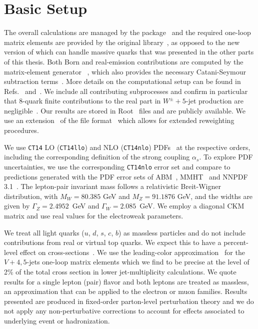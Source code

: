 \section{Basic Setup}
\label{sec_setup}
The overall calculations are managed by the \SHERPA{}
package~\cite{Sherpa} and the required one-loop matrix elements are
provided by the original \BlackHat{}
library~\cite{Berger:2008sj}, as opposed to the new version of \BlackHat{} \cite{wbbpaper} which
  can handle massive quarks that was presented in the other
  parts of this thesis. Both Born and real-emission contributions
are computed by the matrix-element generator \COMIX{}~\cite{Comix}, which also
provides the necessary Catani-Seymour subtraction
terms~\cite{Catani:1996vz}. More details on the computational setup
can be found in Refs.~\cite{BH:W5j} and~\cite{BH:Z4j}. We include all
contributing subprocesses and confirm in
particular that 8-quark finite contributions to the real part in $W^\pm+5$-jet
production are negligible~\cite{BH:W5j}. Our results are stored
in Root~\cite{ROOT} \ntuple{} files and are publicly available. We use
an extension~\cite{Greiner:2016awe} of the \ntuple{} file format~\cite{BH:Ntuples} which allows for
extended reweighting procedures.


We use \texttt{CT14} LO (\texttt{CT14llo}) and NLO (\texttt{CT14nlo})
PDFs~\cite{CT14} at the respective orders, including the corresponding
definition of the strong coupling $\alpha_s$. To explore PDF
uncertainties, we use the corresponding \texttt{CT14nlo} error set and compare to predictions
generated with the PDF error sets of ABM~\cite{ABM}, MMHT~\cite{MMHT} and NNPDF 3.1~\cite{NNPDF}.
%
The lepton-pair invariant mass follows a relativistic Breit-Wigner distribution,
with $M_W=80.385$ GeV and $M_Z=91.1876$ GeV, and the widths are given by
$\Gamma_Z=2.4952$~GeV and $\Gamma_W=2.085$~GeV. We employ a diagonal CKM
matrix and use real values for the electroweak parameters.

We treat all light quarks ($u$, $d$, $s$, $c$, $b$) as massless
particles and do not include contributions from real or virtual top
quarks. We expect this to have
a percent-level effect on
cross-sections~\cite{BH:W4j,BH:Z4j,Campbell:2016tcu,wbbpaper}. We use
the leading-color approximation~\cite{Ita:2011ar} for the $V+4,5$-jets one-loop matrix elements which we find to be
precise at the level of 2\% of the total cross section in lower
jet-multiplicity calculations. We quote results for a single 
lepton (pair) flavor and both leptons are treated as massless, an approximation that can be 
applied to the electron or muon families.
%
Results presented are produced in fixed-order parton-level perturbation theory
and we do not apply any non-perturbative corrections to account for effects
associated to underlying event or hadronization.

